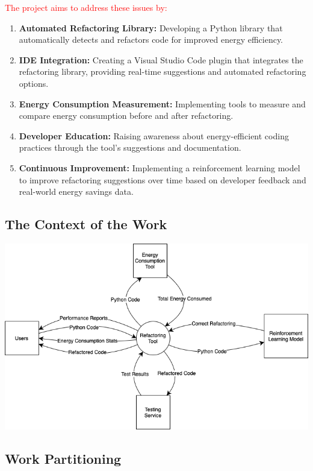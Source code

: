 \documentclass[12pt]{article}
\begin{document}
  \textcolor{red}{The project aims to address these issues by:}
  \begin{enumerate}
    \item \textbf{Automated Refactoring Library:} Developing a Python library that automatically detects and refactors code for improved energy efficiency.
    \item \textbf{IDE Integration:} Creating a Visual Studio Code plugin that integrates the refactoring library, providing real-time suggestions and automated refactoring options.
    \item \textbf{Energy Consumption Measurement:} Implementing tools to measure and compare energy consumption before and after refactoring.
    \item \textbf{Developer Education:} Raising awareness about energy-efficient coding practices through the tool's suggestions and documentation.
    \item \textbf{Continuous Improvement:} Implementing a reinforcement learning model to improve refactoring suggestions over time based on developer feedback and real-world energy savings data.
  \end{enumerate}  

\subsection{The Context of the Work}

\includegraphics[scale=0.5]{../Images/WorkContextModel.png}

\subsection{Work Partitioning}
\end{document}
